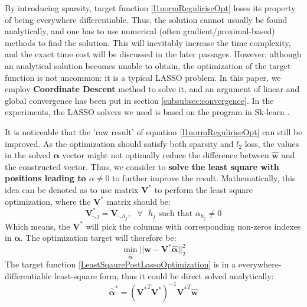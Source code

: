 \documentclass[preprint,10pt]{elsarticle}
\begin{document}
By introducing sparsity, target function \ref{l1normReguliriseOpt} loses its property of being everywhere differentiable. Thus, the solution cannot usually be found analytically, and one has to use numerical (often gradient/proximal-based) methods to find the solution. This will inevitably increase the time complexity, and the exact time cost will be discussed in the later passages. However, although an analytical solution becomes unable to obtain, the optimization of the target function is not uncommon: it is a typical LASSO problem. In this paper, we employ \textbf{Coordinate Descent} method to solve it, and an argument of linear and global convergence has been put in section \ref{subsubsec:convergence}. In the experiments, the LASSO solvers we used is based on the program in Sk-learn \cite{scikit-learn}. \par
It is noticeable that the 'raw result' of equation \ref{l1normReguliriseOpt} can still be improved. As the optimization should satisfy both sparsity and $l_2$ loss, the values in the solved $\boldsymbol{\alpha}$ vector might not optimally reduce the difference between $\boldsymbol{\hat{w}}$ and the constructed vector. Thus, we consider to \textbf{solve the least square with positions leading to $\alpha \neq 0$} to further improve the result. Mathematically, this idea can be denoted as to use matrix $\boldsymbol{V}^{*}$ to perform the least square optimization, where the $\boldsymbol{V}^{*}$ matrix should be:\\
\begin{equation}
\label{NpStarRetrievalMethod}
\boldsymbol{V}^{*}_{\cdot,j} = \boldsymbol{V}_{\cdot,h_{j}},\text{ } \forall \text{ } h_{j} \text{ such that } \alpha_{h_{j}} \neq 0
\end{equation}
Which means, the $\boldsymbol{V}^{*}$ will pick the columns with corresponding non-zeros indexes in $\boldsymbol{\alpha}$. The optimization target will therefore be:\\
\begin{equation}
\label{LeastSqaurePostLassoOptimization}
\min_{\boldsymbol{\hat{\alpha}}} ||\boldsymbol{\hat{w}} -\boldsymbol{V}^{*}\boldsymbol{\hat{\alpha}}||_{2}^{2}
\end{equation}
The target function \ref{LeastSqaurePostLassoOptimization} is in a everywhere-differentiable least-square form, thus it could be direct solved analytically:\\
\begin{equation}
\label{PostLassoLeastSquareSolution}
\boldsymbol{\hat{\alpha}}^{*} = ({\boldsymbol{V}^{*}}^{T}{\boldsymbol{V}^{*}})^{-1}{\boldsymbol{V}^{*}}^{T}\boldsymbol{\hat{w}}
\end{equation}
\end{document}
